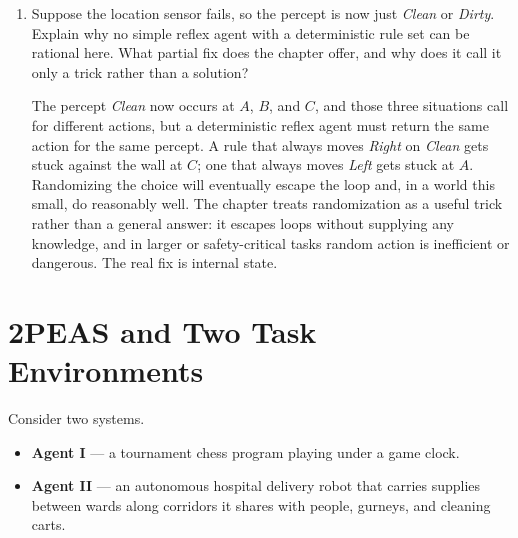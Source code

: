 \documentclass[11pt]{article}
\newif\ifsol
\newcommand{\ans}[1]{\ifsol\relax\else\vspace{#1}\filbreak\fi}
\newenvironment{solution}
  {\ifsol
     \par\vspace{4pt}\noindent
     \color{solgreen}\textbf{Solution.}\enspace\itshape\ignorespaces
   \else
     \setbox0\vbox\bgroup
   \fi}
  {\ifsol\par\normalcolor\upshape\vspace{4pt}\else\egroup\fi}
\newcommand{\qhead}[1]{\section*{#1}}
\begin{document}
\begin{enumerate}[label=(\alph*),leftmargin=*]
\item Suppose the location sensor fails, so the percept is now just \textit{Clean} or
\textit{Dirty}. Explain why no simple reflex agent with a deterministic rule set can be
rational here. What partial fix does the chapter offer, and why does it call it only a
trick rather than a solution?
\ans{1.4in}
\begin{solution}
The percept \textit{Clean} now occurs at $A$, $B$, and $C$, and those three situations call
for different actions, but a deterministic reflex agent must return the same action for the
same percept. A rule that always moves \textit{Right} on \textit{Clean} gets stuck against
the wall at $C$; one that always moves \textit{Left} gets stuck at $A$. Randomizing the
choice will eventually escape the loop and, in a world this small, do reasonably well. The
chapter treats randomization as a useful trick rather than a general answer: it escapes
loops without supplying any knowledge, and in larger or safety-critical tasks random action
is inefficient or dangerous. The real fix is internal state.
\end{solution}

\end{enumerate}

\newpage
\qhead{2\quad PEAS and Two Task Environments}

Consider two systems.

\begin{itemize}[leftmargin=*,itemsep=2pt]
\item \textbf{Agent I} --- a tournament chess program playing under a game clock.
\item \textbf{Agent II} --- an autonomous hospital delivery robot that carries supplies
between wards along corridors it shares with people, gurneys, and cleaning carts.
\end{itemize}
\end{document}
